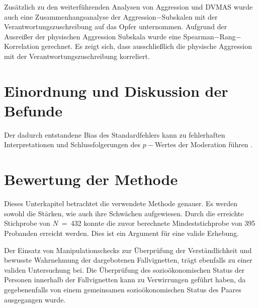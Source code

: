 Zusätzlich zu den weiterführenden Analysen von Aggression und DVMAS wurde auch eine Zusammenhangsanalyse der Aggression$-$Subskalen mit der Verantwortungszuschreibung auf das Opfer unternommen. Aufgrund der Ausreißer der physischen Aggression Subskala wurde eine Spearman$-$Rang$-$Korrelation gerechnet. Es zeigt sich, dass ausschließlich die physische Aggression mit der Verantwortungszuschreibung korreliert.


\section{Einordnung und Diskussion der Befunde}     \label{sec_5.2}

Der dadurch entstandene Bias des Standardfehlers kann zu fehlerhaften Interpretationen und Schlussfolgerungen des $p-$Wertes der Moderation führen \parencite{Voraussetzung_Moderation}.

\section{Bewertung der Methode}   \label{sec_5.3}
Dieses Unterkapitel betrachtet die verwendete Methode genauer. Es werden sowohl die Stärken, wie auch ihre Schwächen aufgewiesen.
Durch die erreichte Stichprobe von $N$~=~432 konnte die zuvor berechnete Mindeststichprobe von 395 Probanden erreicht werden. Dies ist ein Argument für eine valide Erhebung. 

Der Einsatz von Manipulationschecks zur Überprüfung der Verständlichkeit und bewusste Wahrnehmung der dargebotenen Fallvignetten, trägt ebenfalls zu einer validen Untersuchung bei. Die Überprüfung des sozioökonomischen Status der Personen innerhalb der Fallvignetten kann zu Verwirrungen geführt haben, da gegebenenfalls von einem gemeinsamen sozioökonomischen Status des Paares ausgegangen wurde.


